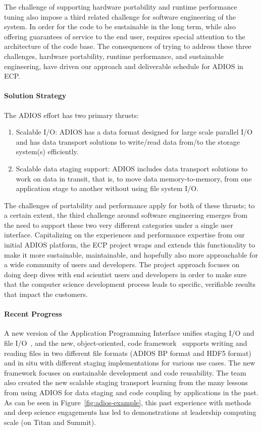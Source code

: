 The challenge of supporting hardware portability and runtime performance tuning also impose a third related challenge for software engineering of the system.  In order for the code to be sustainable in the long term, while also offering guarantees of service to the end user, requires special attention to the architecture of the code base.  The consequences of trying to address these three challenges, hardware portability, runtime performance, and sustainable engineering, have driven our approach and deliverable schedule for ADIOS in ECP.

\paragraph{Solution Strategy}

The ADIOS effort has two primary thrusts:
\begin{enumerate}
	\item Scalable I/O: ADIOS has a data format designed for large scale parallel I/O and has data transport solutions to write/read data from/to the storage system(s) efficiently.
	\item Scalable data staging support:  ADIOS includes data transport solutions to work on data in transit, that is, to move data memory-to-memory, from one application stage to another without using file system I/O.
\end{enumerate}

The challenges of portability and performance apply for both of these thrusts; to a certain extent, the third challenge around software engineering emerges from the need to support these two very different categories under a single user interface.  Capitalizing on the experiences and performance expertise from our initial ADIOS platform, the ECP project wraps and extends this functionality to make it more sustainable, maintainable, and hopefully also more approachable for a wide community of users and developers.  The project approach focuses on doing deep dives with end scientist users and developers in order to make sure that the computer science development process leads to specific, verifiable results that impact the customers.


\paragraph{Recent Progress}

A new version of the Application Programming Interface unifies staging I/O and file I/O~\cite{ADIOS2-docs}, and the new, object-oriented, code framework~\cite{ADIOS2-git} supports  writing and reading files in two different file formats (ADIOS BP format and HDF5 format) and in situ with different staging implementations for various use cases. The new framework focuses on sustainable development and code reusability. The team also created the new scalable staging transport learning from the many lessons from using ADIOS for data staging and code coupling by applications in the past. As can be seen in Figure~\ref{fig:adios-example}, this past experience with methods and deep science engagements has led to demonstrations at leadership computing scale (on Titan and Summit).

